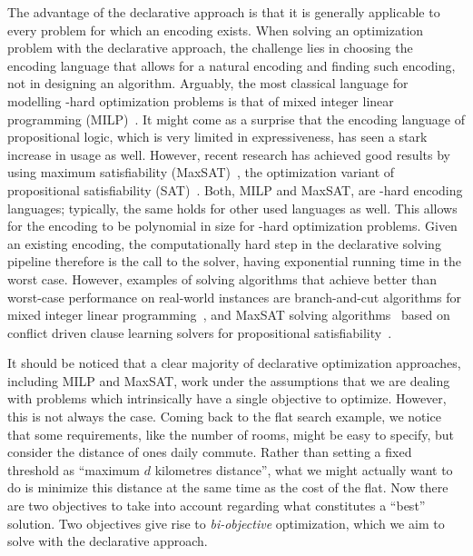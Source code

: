 The advantage of the declarative approach is that it is generally applicable to every problem for which an encoding exists.
When solving an optimization problem with the declarative approach, the challenge lies in choosing the encoding language that allows for a natural encoding and finding such encoding, not in designing an algorithm.
Arguably, the most classical language for modelling \NP-hard optimization problems is that of mixed integer linear programming (MILP)~\autocites{ChenEtAl2010-intro,KorteVygen2018-5}.
It might come as a surprise that the encoding language of propositional logic, which is very limited in expressiveness, has seen a stark increase in usage as well.
However, recent research has achieved good results by using maximum satisfiability (MaxSAT)~\autocite{handbook2-maxsat}, the optimization variant of propositional satisfiability (SAT)~\autocite{handbook2-sat}.
Both, MILP and MaxSAT, are \NP-hard encoding languages;
typically, the same holds for other used languages as well.
This allows for the encoding to be polynomial in size for \NP-hard optimization problems.
Given an existing encoding, the computationally hard step in the declarative solving pipeline therefore is the call to the solver, having exponential running time in the worst case.
However, examples of solving algorithms that achieve better than worst-case performance on real-world instances are branch-and-cut algorithms for mixed integer linear programming~\autocite{ChenEtAl2010-branch-and-cut}, and MaxSAT solving algorithms~\autocite{handbook2-maxsat} based on conflict driven clause learning solvers for propositional satisfiability~\autocite{handbook2-cdcl}.

It should be noticed that a clear majority of declarative optimization approaches, including MILP and MaxSAT, work under the assumptions that we are dealing with problems which intrinsically have a single objective to optimize.
However, this is not always the case.
Coming back to the flat search example, we notice that some requirements, like the number of rooms, might be easy to specify, but consider the distance of ones daily commute.
Rather than setting a fixed threshold as ``maximum $d$ kilometres distance'', what we might actually want to do is minimize this distance at the same time as the cost of the flat.
Now there are two objectives to take into account regarding what constitutes a ``best'' solution.
Two objectives give rise to \emph{bi-objective} optimization, which we aim to solve with the declarative approach.

